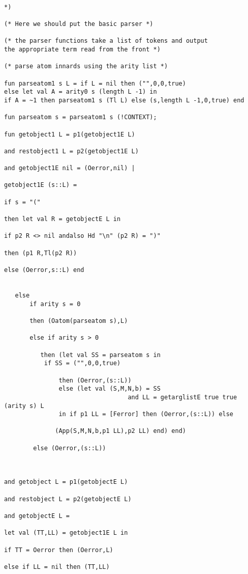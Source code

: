 \documentclass[12pt]{article}
\begin{document}
\newpage

\begin{verbatim}

*)

(* Here we should put the basic parser *)

(* the parser functions take a list of tokens and output
the appropriate term read from the front *)

(* parse atom innards using the arity list *)

fun parseatom1 s L = if L = nil then ("",0,0,true)
else let val A = arity0 s (length L -1) in 
if A = ~1 then parseatom1 s (Tl L) else (s,length L -1,0,true) end

fun parseatom s = parseatom1 s (!CONTEXT);

fun getobject1 L = p1(getobject1E L) 

and restobject1 L = p2(getobject1E L)

and getobject1E nil = (Oerror,nil) |

getobject1E (s::L) =

if s = "(" 

then let val R = getobjectE L in 

if p2 R <> nil andalso Hd "\n" (p2 R) = ")"

then (p1 R,Tl(p2 R))

else (Oerror,s::L) end


   else 
       if arity s = 0 
	
	   then (Oatom(parseatom s),L)

       else if arity s > 0 
	
	      then (let val SS = parseatom s in 
           if SS = ("",0,0,true)
		   
		       then (Oerror,(s::L)) 
			   else (let val (S,M,N,b) = SS
                                  and LL = getarglistE true true (arity s) L
               in if p1 LL = [Ferror] then (Oerror,(s::L)) else

              (App(S,M,N,b,p1 LL),p2 LL) end) end)
			   
        else (Oerror,(s::L))
		

		
and getobject L = p1(getobjectE L)

and restobject L = p2(getobjectE L)
		
and getobjectE L =

let val (TT,LL) = getobject1E L in

if TT = Oerror then (Oerror,L)

else if LL = nil then (TT,LL)


\end{verbatim}
\end{document}
